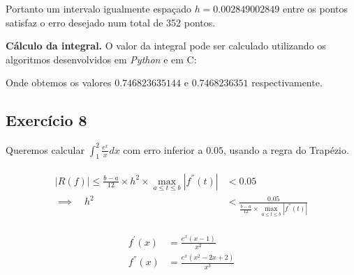 \documentclass[paper=a4, fontsize=12pt]{scrartcl}
\numberwithin{equation}{section} %
\numberwithin{figure}{section} %
\numberwithin{table}{section} %
\newcommand{\euler}{e}
\begin{document}
		Portanto um intervalo igualmente espaçado $h = 0.002849002849$ entre os pontos satisfaz o erro desejado num total de 352 pontos.

		\textbf{Cálculo da integral.} O valor da integral pode ser calculado utilizando os algoritmos desenvolvidos em \textit{Python} e em C:

		\hspace{2cm}

		

		\hspace{2cm}

		

		Onde obtemos os valores $0.746823635144$ e $0.7468236351$	respectivamente.

		\subsection{Exercício 8}

		Queremos calcular $\int_{1}^{2} \frac{\euler^x}{x} dx$ com erro inferior a $ 0.05 $, usando a regra do Trapézio.

		\begin{align*}
			\begin{split}
				| R(f) | \leq \frac{b - a}{12} \times h^2 \times \max_{a \leq t \leq b} |f^{''}(t)| & < 0.05\\ \implies \quad h^2  &< \frac{0.05}{\frac{b - a}{12} \times \max_{a \leq t \leq b} |f^{''}(t)|}
			\end{split}
		\end{align*}


		\begin{align*}
			\begin{split}
				f^{'} (x) &= \frac{\euler^{x}(x - 1) }{x^{2}}\\
				f^{''} (x) &= \frac{\euler^{x}(x^2 -2x + 2)}{x^3}\\
			\end{split}
		\end{align*}
\end{document}
